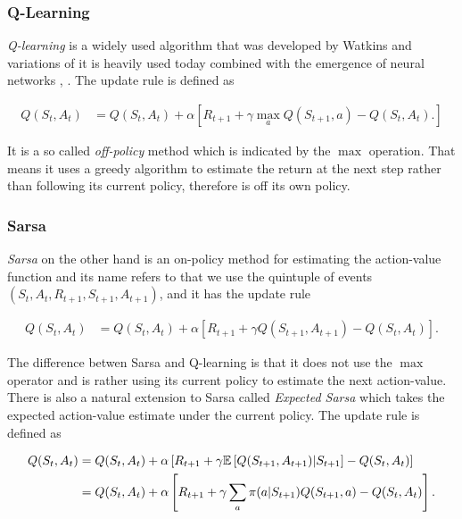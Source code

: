 \documentclass[result.tex]{subfiles}
\begin{document}
    \subsubsection*{Q-Learning}

    \textit{Q-learning} is a widely used algorithm that was developed by Watkins \cite{watkins1989learning} and variations of it is heavily used today combined with the emergence of neural networks \cite{lange2010deep}, \cite{van2016deep}. The update rule is defined as

    \begin{align*}
        Q(S_t, A_t) &=
        Q(S_t , A_t) +
        \alpha \left[
        R_{t + 1} +
        \gamma \max_a Q(S_{t + 1}, a) - Q(S_t, A_t).
        \right]
    \end{align*}

    It is a so called \textit{off-policy} method which is indicated by the $\max$ operation. That means it uses a greedy algorithm to estimate the return at the next step rather than following its current policy, therefore is off its own policy.

    \subsubsection*{Sarsa}

    \textit{Sarsa} on the other hand is an on-policy method for estimating the action-value function and its name refers to that we use the quintuple of events $(S_t, A_t, R_{t + 1}, S_{t + 1}, A_{t + 1})$, and it has the update rule

    \begin{align*}
        Q(S_t, A_t) &=
        Q(S_t , A_t) +
        \alpha \left[
        R_{t + 1} +
        \gamma Q(S_{t + 1}, A_{t + 1}) - Q(S_t, A_t)
        \right].
    \end{align*}

    The difference betwen Sarsa and Q-learning is that it does not use the $\max$ operator and is rather using its current policy to estimate the next action-value. There is also a natural extension to Sarsa called \textit{Expected Sarsa} which takes the expected action-value estimate under the current policy. The update rule is defined as

    \begin{align*}
        Q(S_t, A_t) &=
        Q(S_t , A_t) +
        \alpha \left[
        R_{t + 1} +
        \gamma \mathbb{E} \left[ Q(S_{t + 1}, A_{t + 1}) | S_{t + 1}
        \right] -
        Q(S_t, A_t)
        \right] \\
        &=
        Q(S_t , A_t) +
        \alpha \left[
        R_{t + 1} +
        \gamma \sum_a \pi (a | S_{t + 1}) Q(S_{t + 1}, a) -
        Q(S_t, A_t)
        \right].
    \end{align*}
\end{document}
